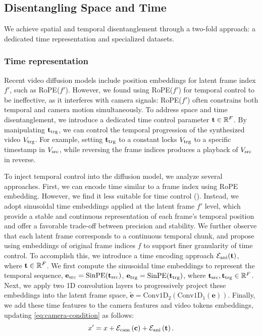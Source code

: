 \subsection{Disentangling Space and Time}
We achieve spatial and temporal disentanglement through a two-fold approach: a dedicated time representation and specialized datasets.

\subsubsection{Time representation}
\label{sec:time_embedding}
Recent video diffusion models include position embeddings for latent frame index $f'$, such as RoPE($f'$). 
However, we found using RoPE($f'$) for temporal control to be ineffective, as it interferes with camera signals: RoPE($f'$) often constrains both temporal and camera motion simultaneously.
To address space and time disentanglement, we introduce a dedicated time control parameter $\mathbf{t} \in \mathbb{R}^F$.
By manipulating $\mathbf{t}_{\text{trg}}$, we can control the temporal progression of the synthesized video $V_{\text{trg}}$. For example, setting $\mathbf{t}_{\text{trg}}$ to a constant locks $V_{\text{trg}}$ to a specific timestamp in $V_{\text{src}}$, while reversing the frame indices produces a playback of $V_{\text{src}}$ in reverse.

To inject temporal control into the diffusion model, we analyze several approaches. 
First, we can encode time similar to a frame index using RoPE embedding. 
However, we find it less suitable for time control ().
Instead, we adopt sinusoidal time embeddings applied at the latent frame $f'$ level, which provide a stable and continuous representation of each frame’s temporal position and offer a favorable trade-off between precision and stability. 
We further observe that each latent frame corresponds to a continuous temporal chunk, and propose using embeddings of original frame indices $f$ to support finer granularity of time control. 
To accomplish this, we introduce a time encoding approach $\mathcal{E}_\text{ani}(\mathbf{t})$, where $\mathbf{t} \in \mathbb{R}^F$. 
We first compute the sinusoidal time embeddings to represent the temporal sequence, $\mathbf{e}_{\text{src}} = \mathrm{SinPE}\!\left(\mathbf{t}_{\text{src}}\right)$, $\mathbf{e}_{\text{trg}} = \mathrm{SinPE}\!\left(\mathbf{t}_{\text{trg}}\right)$, where  $\mathbf{t}_{\text{src}}, \mathbf{t}_{\text{trg}} \in \mathbb{R}^F$.
Next, we apply two 1D convolution layers to progressively project these embeddings into the latent frame space, $\widetilde{\mathbf{e}} = \mathrm{Conv1D_2}(\mathrm{Conv1D_1}(\mathbf{e}))$.
Finally, we add these time features to the camera features and video tokens embeddings, updating \cref{eq:camera-condition} as follows:
\begin{equation}
    x' = x + \mathcal{E}_\text{cam}\left(\mathbf{c}\right) + \mathcal{E}_\text{ani}\left(\mathbf{t}\right).
    \label{eq:cam-and-ani-condition}
\end{equation}

